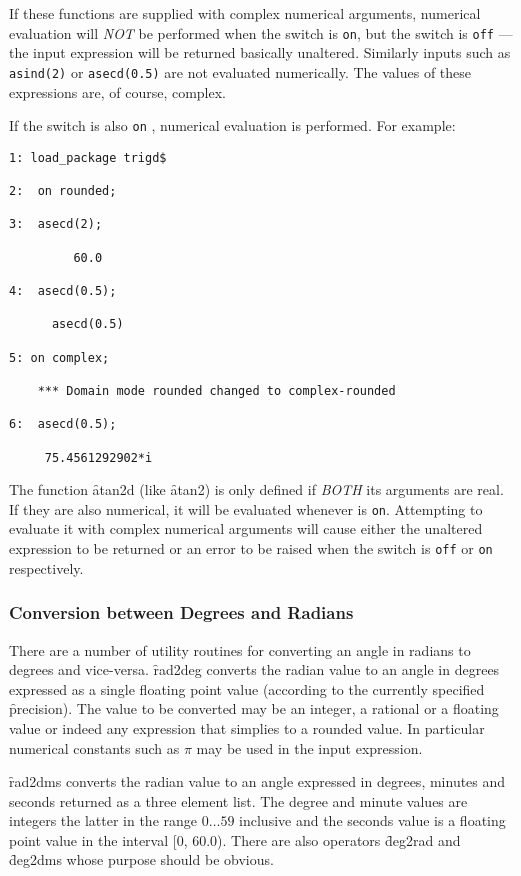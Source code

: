 If these functions are supplied with complex  numerical arguments, numerical evaluation will \emph{NOT} be performed when the switch  is \texttt{on}, but the switch  is  \texttt{off} --- the input expression will be returned basically unaltered. Similarly inputs such as 
\texttt{asind(2)} or \texttt{asecd(0.5)} are not evaluated numerically.  The values of these expressions are, of course, complex.

If the switch  is also \texttt{on} , numerical evaluation is performed.  For example:
\begin{verbatim}
1: load_package trigd$

2:  on rounded;

3:  asecd(2);

         60.0

4:  asecd(0.5);

      asecd(0.5)

5: on complex;

    *** Domain mode rounded changed to complex-rounded

6:  asecd(0.5);

     75.4561292902*i

\end{verbatim}

The function \f{atan2d} (like \f{atan2}) is only defined if \emph{BOTH} its arguments are real. If they are also numerical, it will be evaluated whenever   is \texttt{on}. Attempting to evaluate it with complex numerical arguments will cause either the unaltered expression to be returned or an error to be 
raised when the switch  is \texttt{off} or \texttt{on} respectively.

\iffalse
\subsubsection{Conversion between Degrees and Radians}
There are a number of utility routines for converting an angle in radians to degrees and vice-versa.  \f{rad2deg} converts the radian value to  an angle in degrees expressed as a single floating point value (according to the currently specified \f{precision}).  
The value to be converted may be an integer, a rational or a floating value or indeed any expression that simplies to a rounded value. In particular  numerical constants such as $\pi$ may be used in the input expression.

\f{rad2dms} converts the radian value to an angle expressed in degrees, minutes and seconds returned as a three element list.  The degree and minute values are integers the latter in the range $0 \ldots 59$ inclusive and the seconds value is  a floating point value in the interval [0, 60.0).
There are also operators \f{deg2rad} and \f{deg2dms} whose purpose should be obvious.


